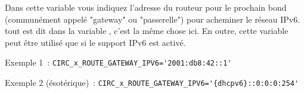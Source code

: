 \begin{description}

Dans cette variable vous indiquez l'adresse du routeur pour le prochain bond (communément
appelé "gateway" ou "passerelle") pour acheminer le réseau IPv6. tout est dit dans la variable
, c'est la même chose ici. En outre, cette variable peut être
utilisé que si le support IPv6 est activé.

Exemple 1~: \verb+CIRC_x_ROUTE_GATEWAY_IPV6='2001:db8:42::1'+

Exemple 2 (ésotérique)~: \verb+CIRC_x_ROUTE_GATEWAY_IPV6='{dhcpv6}::0:0:0:254'+

\end{description}
